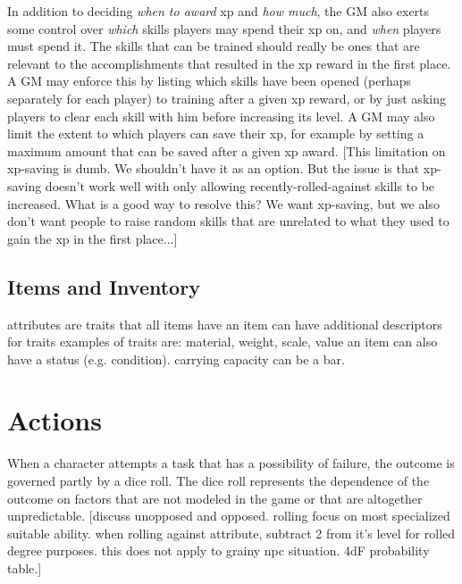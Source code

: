 \documentclass[12pt]{article}
\newcommand{\notes}[1]{{\color{Tan} #1}}
\begin{document}
In addition to deciding \emph{when to award} xp and \emph{how much},
the GM also exerts some control over \emph{which} skills players may spend their xp on, and \emph{when} players must spend it.
The skills that can be trained should really be ones that are relevant to the accomplishments that resulted in the xp reward in the first place.
A GM may enforce this by listing which skills have been opened (perhaps separately for each player) to training after a given xp reward,
or by just asking players to clear each skill with him before increasing its level.
A GM may also limit the extent to which players can save their xp, for example by setting a maximum amount that can be saved after a given xp award.
\notes{[This limitation on xp-saving is dumb. We shouldn't have it as an option.
But the issue is that xp-saving doesn't work well with only allowing recently-rolled-against skills to be increased.
What is a good way to resolve this?
We want xp-saving, but we also don't want people to raise random skills that are unrelated to what they used to gain the xp in the first place...]}





\subsection{Items and Inventory} \label{sec:items}
\notes{attributes are traits that all items have
an item can have additional descriptors for traits
examples of traits are: material, weight, scale, value
an item can also have a status (e.g. condition).
carrying capacity can be a bar.}


\section{Actions}\label{sec:actions}
When a character attempts a task that has a possibility of failure, the outcome is governed partly by a dice roll.
The dice roll represents the dependence of the outcome on factors that are not modeled in the game or that are altogether unpredictable.
\notes{[discuss unopposed and opposed. rolling focus on most specialized suitable ability. when rolling against attribute, subtract 2 from it's level for rolled degree purposes. this does not apply to grainy npc situation. 4dF probability table.]}
\end{document}
